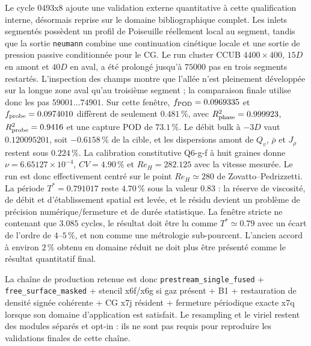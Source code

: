 \documentclass[11pt,a4paper]{article}
\begin{document}
Le cycle 0493x8 ajoute une validation externe quantitative à cette qualification interne, désormais reprise sur le domaine bibliographique complet. Les inlets segmentés possèdent un profil de Poiseuille réellement local au segment, tandis que la sortie \texttt{neumann} combine une continuation cinétique locale et une sortie de pression passive conditionnée pour le CG. Le run cluster CCUB $4400\times400$, $15D$ en amont et $40D$ en aval, a été prolongé jusqu'à $75000$ pas en trois segments restartés. L'inspection des champs montre que l'allée n'est pleinement développée sur la longue zone aval qu'au troisième segment ; la comparaison finale utilise donc les pas $59001\ldots74901$. Sur cette fenêtre, $f_{\rm POD}=0.0969335$ et $f_{\rm probe}=0.0974010$ diffèrent de seulement $0.481\,\%$, avec $R^2_{\rm phase}=0.999923$, $R^2_{\rm probe}=0.9416$ et une capture POD de $73.1\,\%$. Le débit bulk à $-3D$ vaut $0.120095201$, soit $-0.6158\,\%$ de la cible, et les dispersions amont de $Q_v$, $\bar\rho$ et $J_\rho$ restent sous $0.224\,\%$. La calibration constitutive Q6-g-f à huit graines donne $\nu=6.65127\times10^{-4}$, $CV=4.90\,\%$ et $Re_H=282.125$ avec la vitesse mesurée. Le run est donc effectivement centré sur le point $Re_H\simeq280$ de Zovatto--Pedrizzetti. La période $T^*=0.791017$ reste $4.70\,\%$ sous la valeur $0.83$ : la réserve de viscosité, de débit et d'établissement spatial est levée, et le résidu devient un problème de précision numérique/fermeture et de durée statistique. La fenêtre stricte ne contenant que $3.085$ cycles, le résultat doit être lu comme $T^*\simeq0.79$ avec un écart de l'ordre de $4$--$5\,\%$, et non comme une métrologie sub-pourcent. L'ancien accord à environ $2\,\%$ obtenu en domaine réduit ne doit plus être présenté comme le résultat quantitatif final.

La chaîne de production retenue est donc \texttt{prestream\_single\_fused} + \texttt{free\_surface\_masked} + stencil x6f/x6g si gaz présent + B1 + restauration de densité signée cohérente + CG x7j résident + fermeture périodique exacte x7q lorsque son domaine d'application est satisfait. Le resampling et le viriel restent des modules séparés et opt-in : ils ne sont pas requis pour reproduire les validations finales de cette chaîne.
\end{document}
